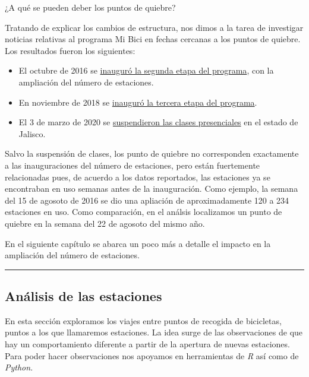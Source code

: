 \documentclass[
]{article}
\begin{document}
¿A qué se pueden deber los puntos de quiebre?

Tratando de explicar los cambios de estructura, nos dimos a la tarea de
investigar noticias relativas al programa Mi Bici en fechas cercanas a
los puntos de quiebre. Los resultados fueron los siguientes:

\begin{itemize}
\item
  El octubre de 2016 se
  \href{https://www.informador.mx/Jalisco/Inauguran-segunda-etapa-de-MiBici-20161027-0035.html}{inauguró
  la segunda etapa del programa}, con la ampliación del número de
  estaciones.
\item
  En noviembre de 2018 se
  \href{https://www.eloccidental.com.mx/local/inauguran-tercera-etapa-de-mibici-2714371.html}{inauguró
  la tercera etapa del programa}.
\item
  El 3 de marzo de 2020 se
  \href{https://www.animalpolitico.com/2020/03/jalisco-suspende-clases-universidades-eventos-masivos-coronavirus/}{suspendieron
  las clases presenciales} en el estado de Jalisco.
\end{itemize}

Salvo la suspensión de clases, los punto de quiebre no corresponden
exactamente a las inauguraciones del número de estaciones, pero están
fuertemente relacionadas pues, de acuerdo a los datos reportados, las
estaciones ya se encontraban en uso semanas antes de la inauguración.
Como ejemplo, la semana del 15 de agosoto de 2016 se dio una apliación
de aproximadamente 120 a 234 estaciones en uso. Como comparación, en el
análsis localizamos un punto de quiebre en la semana del 22 de agosoto
del mismo año.

En el siguiente capítulo se abarca un poco más a detalle el impacto en
la ampliación del número de estaciones.

\begin{center}\rule{0.5\linewidth}{0.5pt}\end{center}

\hypertarget{anuxe1lisis-de-las-estaciones}{%
\subsection{Análisis de las
estaciones}\label{anuxe1lisis-de-las-estaciones}}

En esta sección exploramos los viajes entre puntos de recogida de
bicicletas, puntos a los que llamaremos estaciones. La idea surge de las
observaciones de que hay un comportamiento diferente a partir de la
apertura de nuevas estaciones. Para poder hacer observaciones nos
apoyamos en herramientas de \emph{R} así como de \emph{Python}.
\end{document}
